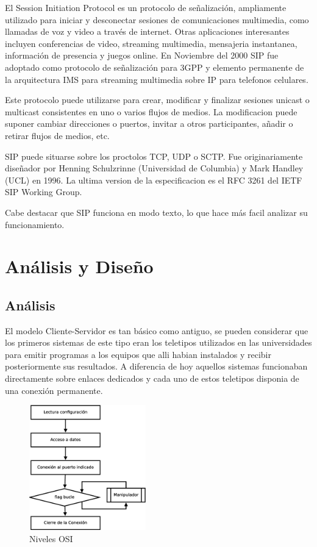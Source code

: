 \documentclass[a4paper,spanish,12pt]{book}
\begin{document}
El Session Initiation Protocol es un protocolo de señalización, ampliamente utilizado para iniciar y desconectar sesiones de comunicaciones multimedia, como llamadas de voz y video a trav\'es de internet. Otras aplicaciones interesantes incluyen conferencias de video, streaming multimedia, mensajeria instantanea, información de presencia y juegos online. En Noviembre del 2000 SIP fue adoptado como protocolo de señalización para 3GPP y elemento permanente de la arquitectura IMS para streaming multimedia sobre IP para telefonos celulares.

Este protocolo puede utilizarse para crear, modificar y finalizar sesiones unicast o multicast consistentes en uno o varios flujos de medios. La modificacion puede suponer cambiar direcciones o puertos, invitar a otros participantes, añadir o retirar flujos de medios, etc.

SIP puede situarse sobre los proctolos TCP, UDP o SCTP. Fue originariamente diseñador por Henning Schulzrinne (Universidad de Columbia) y Mark Handley (UCL) en 1996. La ultima version de la especificacion es el \cite{RFCSIP} RFC 3261 del IETF SIP Working Group.

Cabe destacar que SIP funciona en modo texto, lo que hace más facil analizar su funcionamiento.

\chapter{Análisis y Diseño}
\section{Análisis}
El modelo Cliente-Servidor es tan básico como antiguo, se pueden considerar que los primeros sistemas de este tipo eran los teletipos utilizados en las universidades para emitir programas a los equipos que alli habian instalados y recibir posteriormente sus resultados. A diferencia de hoy aquellos sistemas funcionaban directamente sobre enlaces dedicados y cada uno de estos teletipos disponia de una conexión permanente.

\begin{figure}
	\includegraphics[width=0.45\textwidth]{img/FlujoServicio.eps}
              \caption{Niveles OSI}
  \label{fig:nivelesOSI}
\end{figure}
\end{document}
